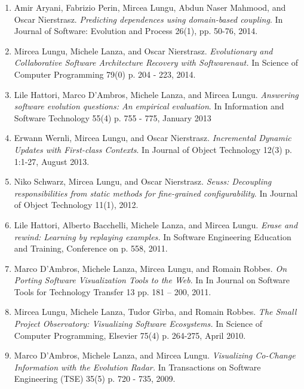 

\begin{enumerate}
\item Amir Aryani, Fabrizio Perin, Mircea Lungu, Abdun Naser Mahmood, and Oscar Nierstrasz. \emph{Predicting dependences using domain-based coupling}. In Journal of Software: Evolution and Process 26(1), pp. 50-76, 2014. 

\item Mircea Lungu, Michele Lanza, and Oscar Nierstrasz. \emph{Evolutionary and Collaborative Software Architecture Recovery with Softwarenaut.}  In Science of Computer Programming 79(0) p. 204 - 223, 2014.

\item Lile Hattori, Marco D'Ambros, Michele Lanza, and Mircea Lungu. \emph{Answering software evolution questions: An empirical evaluation}. In Information and Software Technology 55(4) p. 755 - 775, January 2013

\item Erwann Wernli, Mircea Lungu, and Oscar Nierstrasz. \emph{Incremental Dynamic Updates with First-class Contexts}. In Journal of Object Technology 12(3) p. 1:1-27, August 2013.

\item Niko Schwarz, Mircea Lungu, and Oscar Nierstrasz. \emph{Seuss: Decoupling responsibilities from static methods for fine-grained configurability}. In Journal of Object Technology 11(1), 2012.

\item Lile Hattori, Alberto Bacchelli, Michele Lanza, and Mircea Lungu. \emph{Erase and rewind: Learning by replaying examples.} In Software Engineering Education and Training, Conference on p. 558, 2011.

\item Marco D'Ambros, Michele Lanza, Mircea Lungu, and Romain Robbes. \emph{On Porting Software Visualization Tools to the Web}. In In Journal on Software Tools for Technology Transfer 13 pp. 181 -- 200, 2011.

\item Mircea Lungu, Michele Lanza, Tudor G\^irba, and Romain Robbes. \emph{The Small Project Observatory: Visualizing Software Ecosystems.} In Science of Computer Programming, Elsevier 75(4) p. 264-275, April 2010.

\item Marco D'Ambros, Michele Lanza, and Mircea Lungu. \emph{Visualizing Co-Change Information with the Evolution Radar.} In Transactions on Software Engineering (TSE) 35(5) p. 720 - 735, 2009.
\end{enumerate}





